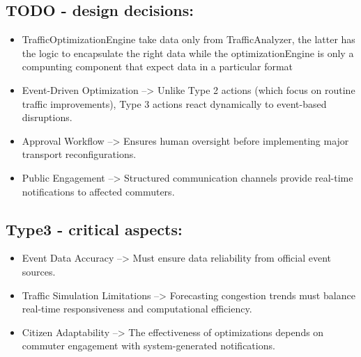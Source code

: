 \documentclass[a4paper,12pt]{article}
\begin{document}
\subsection*{TODO - design decisions:}
\begin{itemize}
    \item TrafficOptimizationEngine take data only from TrafficAnalyzer, the latter has the logic to encapsulate the right data while the optimizationEngine is only a compunting component that expect data in a particular format

    \item Event-Driven Optimization --> Unlike Type 2 actions (which focus on routine traffic improvements), Type 3 actions react dynamically to event-based disruptions.
    \item Approval Workflow --> Ensures human oversight before implementing major transport reconfigurations.
    \item Public Engagement -->  Structured communication channels provide real-time notifications to affected commuters.
\end{itemize}
\subsection*{Type3 - critical aspects:}
\begin{itemize}
    \item Event Data Accuracy --> Must ensure data reliability from official event sources.
    \item Traffic Simulation Limitations --> Forecasting congestion trends must balance real-time responsiveness and computational efficiency.
    \item Citizen Adaptability --> The effectiveness of optimizations depends on commuter engagement with system-generated notifications.
\end{itemize}
\end{document}
